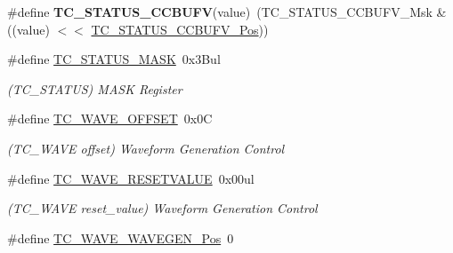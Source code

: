 \begin{DoxyCompactItemize}
\item 
\hypertarget{group___s_a_m_l21___t_c_gada26091ef75065779513ade5c72a238c}{}\#define {\bfseries T\+C\+\_\+\+S\+T\+A\+T\+U\+S\+\_\+\+C\+C\+B\+U\+F\+V}(value)~(T\+C\+\_\+\+S\+T\+A\+T\+U\+S\+\_\+\+C\+C\+B\+U\+F\+V\+\_\+\+Msk \& ((value) $<$$<$ \hyperlink{group___s_a_m_l21___t_c_ga64c356b782a746f7696fd5c098bddb7f}{T\+C\+\_\+\+S\+T\+A\+T\+U\+S\+\_\+\+C\+C\+B\+U\+F\+V\+\_\+\+Pos}))\label{group___s_a_m_l21___t_c_gada26091ef75065779513ade5c72a238c}

\item 
\hypertarget{group___s_a_m_l21___t_c_ga67067da5f170838144218f04778b4d7a}{}\#define \hyperlink{group___s_a_m_l21___t_c_ga67067da5f170838144218f04778b4d7a}{T\+C\+\_\+\+S\+T\+A\+T\+U\+S\+\_\+\+M\+A\+S\+K}~0x3\+Bul\label{group___s_a_m_l21___t_c_ga67067da5f170838144218f04778b4d7a}

\begin{DoxyCompactList}\small\item\em (T\+C\+\_\+\+S\+T\+A\+T\+U\+S) M\+A\+S\+K Register \end{DoxyCompactList}\item 
\hypertarget{group___s_a_m_l21___t_c_gaf5af3f5979489fd8dfedc1f02219ca18}{}\#define \hyperlink{group___s_a_m_l21___t_c_gaf5af3f5979489fd8dfedc1f02219ca18}{T\+C\+\_\+\+W\+A\+V\+E\+\_\+\+O\+F\+F\+S\+E\+T}~0x0\+C\label{group___s_a_m_l21___t_c_gaf5af3f5979489fd8dfedc1f02219ca18}

\begin{DoxyCompactList}\small\item\em (T\+C\+\_\+\+W\+A\+V\+E offset) Waveform Generation Control \end{DoxyCompactList}\item 
\hypertarget{group___s_a_m_l21___t_c_ga45f51117f85987c8601a6043a487a5bb}{}\#define \hyperlink{group___s_a_m_l21___t_c_ga45f51117f85987c8601a6043a487a5bb}{T\+C\+\_\+\+W\+A\+V\+E\+\_\+\+R\+E\+S\+E\+T\+V\+A\+L\+U\+E}~0x00ul\label{group___s_a_m_l21___t_c_ga45f51117f85987c8601a6043a487a5bb}

\begin{DoxyCompactList}\small\item\em (T\+C\+\_\+\+W\+A\+V\+E reset\+\_\+value) Waveform Generation Control \end{DoxyCompactList}\item 
\hypertarget{group___s_a_m_l21___t_c_gabc51dddbbf88d5c313cb3ec2f41ce8d4}{}\#define \hyperlink{group___s_a_m_l21___t_c_gabc51dddbbf88d5c313cb3ec2f41ce8d4}{T\+C\+\_\+\+W\+A\+V\+E\+\_\+\+W\+A\+V\+E\+G\+E\+N\+\_\+\+Pos}~0\label{group___s_a_m_l21___t_c_gabc51dddbbf88d5c313cb3ec2f41ce8d4}


\end{DoxyCompactItemize}
